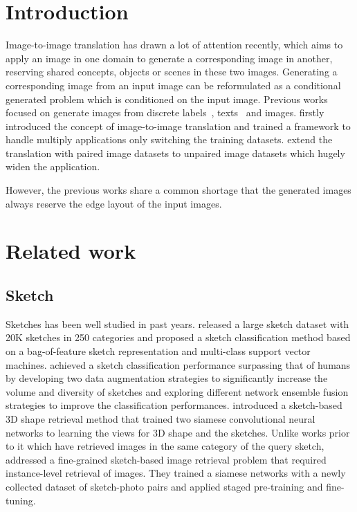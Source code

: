 \section{Introduction}
Image-to-image translation has drawn a lot of attention recently, which aims to apply an image in one domain to generate a corresponding image in another, reserving shared concepts, objects or scenes in these two images.  
%
Generating a corresponding image from an input image can be reformulated as a conditional generated problem which is conditioned on the input image. Previous works focused on generate images from discrete labels~\cite{CGAN}, texts~\cite{reed1, reed2} and images.
\cite{pix2pix} firstly introduced the concept of image-to-image translation and trained a framework to handle multiply applications only switching the training datasets.
%
\cite{a,b,c,d} extend the translation with paired image datasets to unpaired image datasets which hugely widen the application.

However, the previous works share a common shortage that the generated images always reserve the edge layout of the input images. 




\section{Related work}
\subsection{Sketch}
Sketches has been well studied in past years. \cite{HowSketch} released a large sketch dataset with 20K sketches in 250 categories and proposed a sketch classification method based on a bag-of-feature sketch representation and multi-class support vector machines. 
%
\cite{SketchANet} achieved a sketch classification performance surpassing that of humans by developing two data augmentation strategies to significantly increase the volume and diversity of sketches and exploring different network ensemble fusion strategies to improve the classification performances.
\cite{sketch3dshape} introduced a sketch-based 3D shape retrieval method that trained two siamese convolutional neural networks to learning the views for 3D shape and the sketches.
Unlike works prior to it which have retrieved images in the same category of the query sketch, \cite{sketchmethatshoe} addressed a fine-grained sketch-based image retrieval problem that required instance-level retrieval of images. They trained a siamese networks with a newly collected dataset of sketch-photo pairs and applied staged pre-training and fine-tuning.
 
